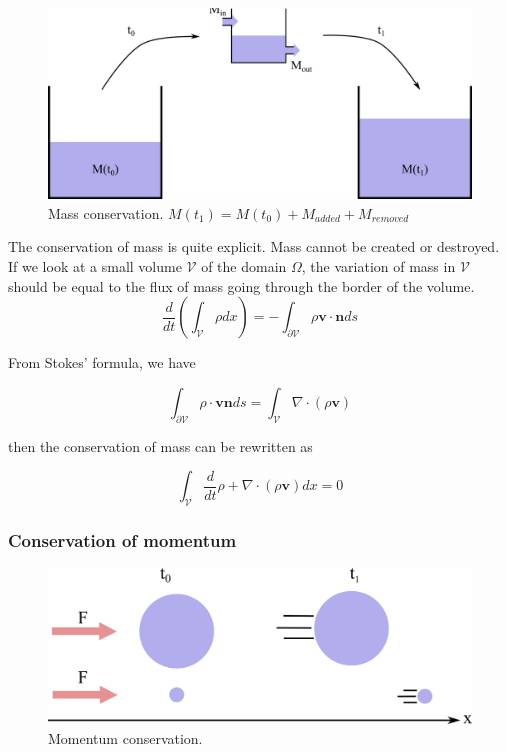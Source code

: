 \begin{figure}[!ht]
\centering
\includegraphics[scale=0.7]{images/continuum_mechanics/massConservation.png}
\caption[STAR mechanics: Mass conservation]{\label{fig:massConservation} Mass conservation. $M(t_{1}) = M(t_{0}) + M_{added} + M_{removed}$}
\end{figure}

The conservation of mass is quite explicit. Mass cannot be created or destroyed. If we look at a small volume $\mathcal{V}$ of the domain $\Omega$, the variation of mass in $\mathcal{V}$ should be equal to the flux of mass going through the border of the volume.
\begin{equation}
    \label{eq:massConservation}
    \frac{d}{dt}\left( \int_{\mathcal{V}} \rho dx \right)
    =
    - \int_{\mathcal{\partial V}}\rho \mathbf{v} \cdot \mathbf{n} ds
\end{equation}

From Stokes' formula, we have

\begin{equation}
\int_{\partial \mathcal{V}} \rho \cdot \mathbf{v} \mathbf{n} ds =
\int_{\mathcal{V}} \nabla \cdot \left( \rho \mathbf{v} \right)
\end{equation}

then the conservation of mass can be rewritten as

\begin{equation}
\int_{\mathcal{V}} \frac{d}{dt} \rho + \nabla \cdot \left( \rho  \mathbf{v} \right) dx = 0
\end{equation}

\subsubsection{Conservation of momentum}

\begin{figure}[!ht]
\centering
\includegraphics[scale=1.5]{images/continuum_mechanics/momentumConservation.png}
\caption[STAR mechanics: Momentum conservation]{\label{fig:momentumConservation} Momentum conservation.}
\end{figure}

